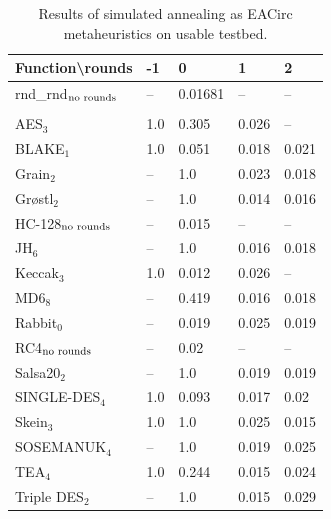 \documentclass[
    digital,    %
    oneside,    %
    color,
    11pt,
    nocover,
    notable,
    nolof,
    nolot,
]{fithesis3}
\newcommand{\fd}{\cellcolor{myred!15}}
\newcommand{\fn}{\cellcolor{mygreen!20}}
\begin{document}
\begin{table}[H]
\centering
\begin{tabular}{l|l l l l}
\textbf{\large Function\textbackslash{}rounds} & \textbf{\large -1} & \textbf{\large 0} & \textbf{\large 1} & \textbf{\large 2}\\ \hline
rnd\_rnd$_{\textnormal{no rounds}}$ & -- & \fn{}0.01681& -- & --    \\\\
AES$_{3}$        & \fd{}1.0   & \fd{}0.305 & \fn{}0.026 & \fn{}--   \\
BLAKE$_{1}$      & \fd{}1.0   & \fd{}0.051 & \fn{}0.018 & \fn{}0.021\\
Grain$_{2}$      & \fd{}--    & \fd{}1.0   & \fn{}0.023 & \fn{}0.018\\
Gr\o stl$_{2}$   & \fd{}--    & \fd{}1.0   & \fn{}0.014 & \fn{}0.016\\
HC-128$_{\textnormal{no rounds}}$& -- & \fn{}0.015 & -- & --        \\
JH$_{6}$         & \fd{}--    & \fd{}1.0   & \fn{}0.016 & \fn{}0.018\\
Keccak$_{3}$     & \fd{}1.0   & \fn{}0.012 & \fn{}0.026 & \fn{}--   \\
MD6$_{8}$        & \fd{}--    & \fd{}0.419 & \fn{}0.016 & \fn{}0.018\\
Rabbit$_{0}$     &      --    & \fn{}0.019 & \fn{}0.025 & \fn{}0.019\\
RC4$_{\textnormal{no rounds}}$& -- & \fn{}0.02  & --    & --        \\
Salsa20$_{2}$    & \fd{}--    & \fd{}1.0   & \fn{}0.019 & \fn{}0.019\\
SINGLE-DES$_{4}$ & \fd{}1.0   & \fd{}0.093 & \fn{}0.017 & \fn{}0.02 \\
Skein$_{3}$      & \fd{}1.0   & \fd{}1.0   & \fn{}0.025 & \fn{}0.015\\
SOSEMANUK$_{4}$  & \fd{}--    & \fd{}1.0   & \fn{}0.019 & \fn{}0.025\\
TEA$_{4}$        & \fd{}1.0   & \fd{}0.244 & \fn{}0.015 & \fn{}0.024\\
Triple DES$_{2}$ & \fd{}--    & \fd{}1.0   & \fn{}0.015 & \fn{}0.029
\end{tabular}
\caption{Results of simulated annealing as EACirc metaheuristics on usable testbed.}
\label{table:res-usable-sa}
\end{table}
\end{document}
